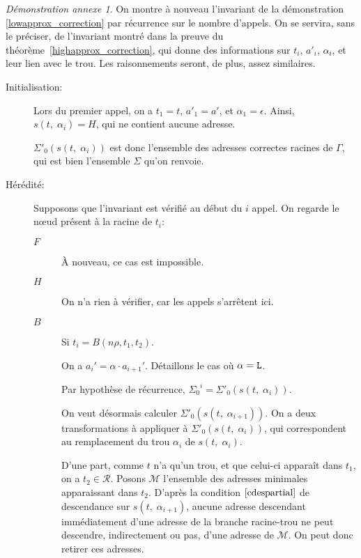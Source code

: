 \documentclass[11pt,a4paper]{article}
\theoremstyle{plain}
\theoremstyle{definition}
\theoremstyle{remark}
\newtheorem{demonstrationappendix}{Démonstration annexe}
\newcommand*{\sequent}{\Gamma}
\newcommand*{\Left}{\textnormal{\texttt{L}}}
\newcommand*{\representations}{\ensuremath{\mathcal{R}}}
\newcommand*{\lowapprox}{\ensuremath{\Sigma_0}}
\newcommand*{\lowapproxspec}{\ensuremath{\Sigma'_0}}
\newcommand*{\treesimplify}{\ensuremath{s}}
\begin{document}
\begin{demonstrationappendix}
    \label{lowapprox_correction_proof}
    On montre à nouveau l'invariant de la démonstration \ref{lowapprox_correction} par récurrence sur le nombre d'appels. On se servira, sans le préciser, de l'invariant montré dans la preuve du théorème~\ref{highapprox_correction}, qui donne des informations sur $t_i$, $a'_i$, $\alpha_i$, et leur lien avec le trou. Les raisonnements seront, de plus, assez similaires.

    \begin{description}
        \item[Initialisation:] Lors du premier appel, on a $t_1 = t$, $a'_1 = a'$, et $\alpha_1 = \epsilon$. Ainsi, $\treesimplify( t, \; {\alpha}_i ) = H$, qui ne contient aucune adresse.
        
        $\lowapproxspec \left( \treesimplify( t, \; {\alpha}_i ) \right)$ est donc l'ensemble des adresses correctes racines de $\sequent$, qui est bien l'ensemble $\Sigma$ qu'on renvoie.

        \item[Hérédité:] Supposons que l'invariant est vérifié au début du $i$\ieme{} appel. On regarde le n\oe ud présent à la racine de $t_i$:

        \begin{description}
            \item[$F$]
                À nouveau, ce cas est impossible.
                
            \item[$H$]
                On n'a rien à vérifier, car les appels s'arrêtent ici. 

            \item[$B$] Si $t_i = B(n\rho, t_1, t_2)$.

            On a $a_i' = \alpha \cdot a_{i+1}'$. Détaillons le cas où $\alpha = \Left$.

            Par hypothèse de récurrence, $\lowapprox^{i} = \lowapproxspec \left( \treesimplify( t, \; {\alpha}_i ) \right)$. 
            
            On veut désormais calculer $\lowapproxspec \left( \treesimplify( t, \; {\alpha}_{i+1} ) \right)$. On a deux transformations à appliquer à $\lowapproxspec \left( \treesimplify( t, \; {\alpha}_{i} ) \right)$, qui correspondent au remplacement du trou $\alpha_{i}$ de $\treesimplify( t, \; {\alpha}_i )$.
            
            D'une part, comme $t$ n'a qu'un trou, et que celui-ci apparaît dans $t_1$, on a $t_2 \in \representations$. Posons $\mathcal{M}$ l'ensemble des adresses minimales apparaissant dans $t_2$. D'après la condition $\ref{cdespartial}$ de descendance sur $\treesimplify( t, \; {\alpha}_{i+1} )$, aucune adresse descendant immédiatement d'une adresse de la branche racine-trou ne peut descendre, indirectement ou pas, d'une adresse de $\mathcal{M}$. On peut donc retirer ces adresses.


\end{description}
\end{description}
\end{demonstrationappendix}
\end{document}
